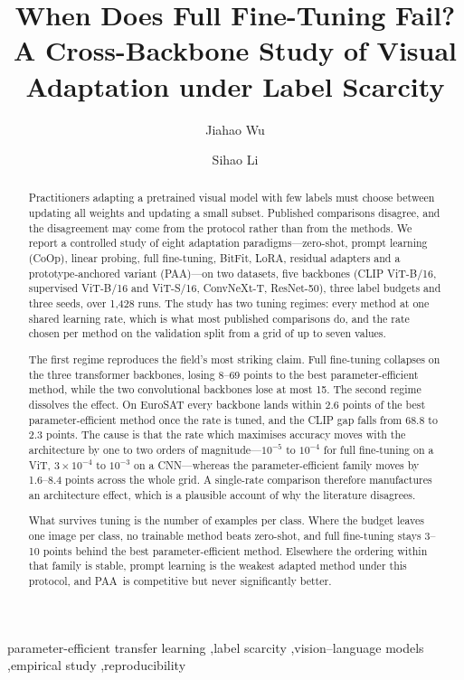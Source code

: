 \documentclass[preprint,12pt]{elsarticle}
\newcommand{\ours}{\textsc{PAA}}
\begin{document}
\setlength{\emergencystretch}{1.5em}
\linenumbers


\begin{frontmatter}

\title{When Does Full Fine-Tuning Fail? A Cross-Backbone Study of Visual
Adaptation under Label Scarcity}

\author[a]{Jiahao Wu}
\author[a]{Sihao Li}


\address[a]{Hubei University, Wuhan, Hubei, China}

\begin{abstract}
Practitioners adapting a pretrained visual model with few labels must choose
between updating all weights and updating a small subset. Published comparisons
disagree, and the disagreement may come from the protocol rather than from the
methods. We report a controlled study of eight adaptation paradigms---zero-shot,
prompt learning (CoOp), linear probing, full fine-tuning, BitFit, LoRA, residual
adapters and a prototype-anchored variant (\ours)---on two datasets, five
backbones (CLIP ViT-B/16, supervised ViT-B/16 and ViT-S/16, ConvNeXt-T,
ResNet-50), three label budgets and three seeds, over 1{,}428 runs. The study has
two tuning regimes: every method at one shared learning rate, which is what most
published comparisons do, and the rate chosen per method on the validation split
from a grid of up to seven values.

The first regime reproduces the field's most striking claim. Full fine-tuning
collapses on the three transformer backbones, losing 8--69 points to the best
parameter-efficient method, while the two convolutional backbones lose at most
15. The second regime dissolves the effect. On EuroSAT every backbone lands
within 2.6 points of the best parameter-efficient method once the rate is tuned,
and the CLIP gap falls from 68.8 to 2.3 points. The cause is that the rate which
maximises accuracy moves with the architecture by one to two orders of
magnitude---$10^{-5}$ to $10^{-4}$ for full fine-tuning on a ViT,
$3\times10^{-4}$ to $10^{-3}$ on a CNN---whereas the parameter-efficient family
moves by 1.6--8.4 points across the whole grid. A single-rate comparison
therefore manufactures an architecture effect, which is a plausible account of
why the literature disagrees.

What survives tuning is the number of examples per class. Where the budget leaves
one image per class, no trainable method beats zero-shot, and full fine-tuning
stays 3--10 points behind the best parameter-efficient method. Elsewhere the
ordering within that family is stable, prompt learning is the weakest adapted
method under this protocol, and \ours\ is competitive but never significantly
better.
\end{abstract}

\begin{keyword}
parameter-efficient transfer learning \sep label scarcity \sep vision--language
models \sep empirical study \sep reproducibility
\end{keyword}

\end{frontmatter}
\end{document}
